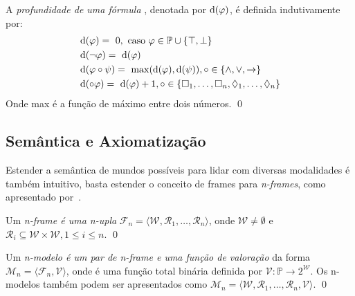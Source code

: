             \sloppy
            \begin{definicao}
                A \textit{profundidade de uma fórmula} \PHI, denotada por \(\operatorname{d}(\varphi)\), é definida indutivamente por:
                \begin{align*}
                    &\funcao{d}(\phi) = \ 0, \text{ caso } \phi \in \mathbb{P} \cup \{\top,\bot\} \\
                    &\funcao{d}(\neg\phi) = \ \funcao{d}(\phi) \\
                    &\funcao{d}(\phi \circ \psi) = \ \funcao{max}(\funcao{d}(\phi), \funcao{d}(\psi)), \circ \in \{\land, \lor, \to\} \\
                    &\funcao{d}(\circ \phi) = \ \funcao{d}(\phi) + 1, \circ \in \{\Box_1,\dots,\Box_n,\Diamond_1,\dots,\Diamond_n\}
                \end{align*}
                Onde max é a função de máximo entre dois números. \qed
            \end{definicao}

        \subsection{Semântica e Axiomatização}
            \label{subsec:MultimodaisSemAx}
            Estender a semântica de mundos possíveis para lidar com diversas modalidades é também intuitivo, basta estender o conceito de frames para \textit{n-frames},
            como apresentado por~.

            \begin{definicao}[n-frames]
                \sloppy
                Um \textit{n-frame é uma n-upla} \({\mathcal{F}_n = \langle \mathcal{W}, \mathcal{R}_1,\dots,\mathcal{R}_n \rangle}\), onde \(\mathcal{W} \neq \emptyset\) e
                \(\mathcal{R}_i \subseteq \mathcal{W} \times \mathcal{W}, 1 \leq i \leq n\). \qed
            \end{definicao}

            \begin{definicao}[n-modelos]
                Um \textit{n-modelo é um par de n-frame e uma função de valoração} da forma
                \(\mathcal{M}_n = \langle \mathcal{F}_n, \mathcal{V} \rangle\), onde  é uma função total binária
                definida por \(\mathcal{V}: \mathbb{P} \to 2^{\mathcal{W}}\).
                Os n-modelos também podem ser apresentados como \({\mathcal{M}_n = \langle \mathcal{W}, \mathcal{R}_1,\dots,\mathcal{R}_n, \mathcal{V} \rangle}\). \qed
            \end{definicao}

